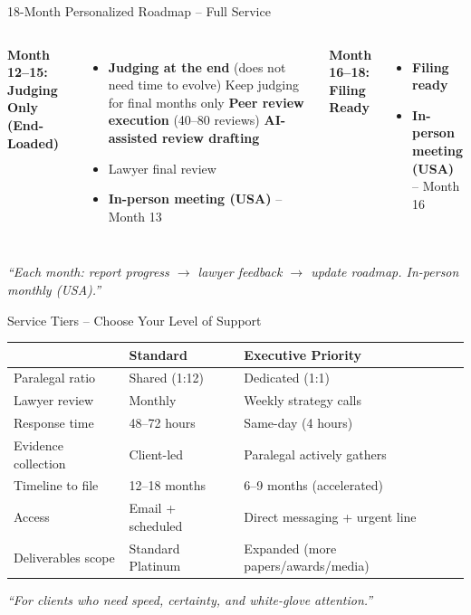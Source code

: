 \documentclass[aspectratio=169, 10pt]{beamer}
\begin{document}
\begin{frame}{18-Month Personalized Roadmap – Full Service}
\begin{columns}[T]
		\textbf{Month 12--15: Judging Only (End-Loaded)}
		\begin{itemize}
			\item \textbf{Judging at the end} (does not need time to evolve)
			 Keep judging for final months only
			 \textbf{Peer review execution} (40--80 reviews)
			 \textbf{AI-assisted review drafting}
			\item Lawyer final review
			\item \textbf{In-person meeting (USA)} -- Month 13
		\end{itemize}
		
		\textbf{Month 16--18: Filing Ready}
		\begin{itemize}
			\item \textbf{Filing ready}
			\item \textbf{In-person meeting (USA)} -- Month 16
		\end{itemize}
	\end{columns}
	
	\vspace{0.2cm}
	\centering
	\textcolor{accentgold}{\textit{``Each month: report progress $\rightarrow$ lawyer feedback $\rightarrow$ update roadmap. In-person monthly (USA).''}}
\end{frame}



	\begin{frame}{Service Tiers – Choose Your Level of Support}
		\begin{table}
			\centering
			\scriptsize
			\begin{tabular}{p{2.2cm}p{2.5cm}p{2.5cm}}
				\toprule
				& \textbf{Standard} & \textbf{Executive Priority} \\
				\midrule
				Paralegal ratio & Shared (1:12) & Dedicated (1:1) \\
				Lawyer review & Monthly & Weekly strategy calls \\
				Response time & 48–72 hours & Same-day (4 hours) \\
				Evidence collection & Client-led & Paralegal actively gathers \\
				Timeline to file & 12–18 months & 6–9 months (accelerated) \\
				Access & Email + scheduled & Direct messaging + urgent line \\
				Deliverables scope & Standard Platinum & Expanded (more papers/awards/media) \\
				\bottomrule
			\end{tabular}
		\end{table}
		\centering
		\vspace{0.3cm}
		\textcolor{premiumpurple}{\textit{“For clients who need speed, certainty, and white-glove attention.”}}
	\end{frame}
	
\end{document}
